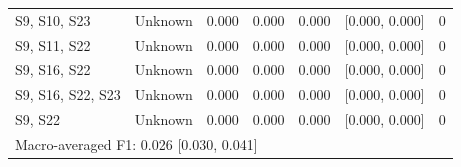 \begin{table}[h]
\begin{tabular}{llccccr}
S9, S10, S23 & Unknown & 0.000 & 0.000 & 0.000 & [0.000, 0.000] & 0 \\
S9, S11, S22 & Unknown & 0.000 & 0.000 & 0.000 & [0.000, 0.000] & 0 \\
S9, S16, S22 & Unknown & 0.000 & 0.000 & 0.000 & [0.000, 0.000] & 0 \\
S9, S16, S22, S23 & Unknown & 0.000 & 0.000 & 0.000 & [0.000, 0.000] & 0 \\
S9, S22 & Unknown & 0.000 & 0.000 & 0.000 & [0.000, 0.000] & 0 \\
\hline
\multicolumn{7}{l}{Macro-averaged F1: 0.026 [0.030, 0.041]} \\
\hline
\end{tabular}
\end{table}